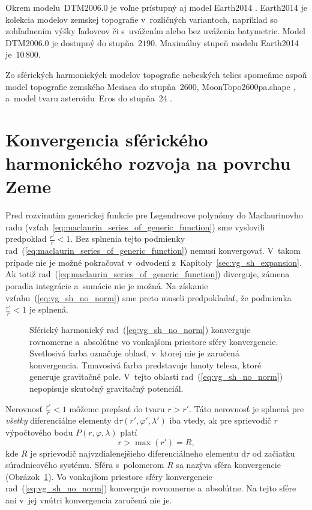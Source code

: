 \documentclass[a4paper, 12pt]{book}
\newcommand{\diff}{\mathrm d}
\begin{document}
Okrem modelu~DTM2006.0 je voľne prístupný aj model Earth2014 
\parencite{Hirt2015}.  Earth2014 je kolekcia modelov zemskej topografie 
v~rozličných variantoch, napríklad so zohľadnením výšky ľadovcov či s~uvážením 
alebo bez uváženia batymetrie.  Model DTM2006.0 je dostupný do stupňa~$2190$.  
Maximálny stupeň modelu Earth2014 je~$10\, 800$.

Zo sférických harmonických modelov topografie nebeských telies spomeňme aspoň 
model topografie zemského Mesiaca do stupňa~2600, MoonTopo2600pa.shape 
\parencite{Wieczorek2015}, a~model tvaru asteroidu~Eros do stupňa~24 
\parencite{Zuber2000}.






\section{Konvergencia sférického harmonického rozvoja na povrchu Zeme}
\label{sec:convergence_of_spherical_harmonics}

Pred rozvinutím generickej funkcie pre Legendreove polynómy do Maclaurinovho 
radu (vzťah~\ref{eq:maclaurin_series_of_generic_function}) sme vyslovili 
predpoklad $\frac{r'}{r} < 1$.  Bez splnenia tejto podmienky 
rad~(\ref{eq:maclaurin_series_of_generic_function}) nemusí konvergovať.  
V~takom prípade nie je možné pokračovať v~odvodení 
z~Kapitoly~\ref{sec:vg_sh_expansion}.  Ak totiž 
rad~(\ref{eq:maclaurin_series_of_generic_function}) diverguje, zámena poradia 
integrácie a~sumácie nie je možná.  Na získanie vzťahu~(\ref{eq:vg_sh_no_norm}) 
sme preto museli predpokladať, že podmienka $\frac{r'}{r} < 1$ je splnená.

\begin{figure}
\centering

\caption{Sférický harmonický rad~(\ref{eq:vg_sh_no_norm}) konverguje rovnomerne 
a~absolútne vo vonkajšom priestore sféry konvergencie.  Svetlosivá farba 
označuje oblasť, v~ktorej nie je zaručená konvergencia.  Tmavosivá farba 
predstavuje hmoty telesa, ktoré generuje gravitačné pole.  V~tejto oblasti 
rad~(\ref{eq:vg_sh_no_norm}) nepopisuje skutočný gravitačný potenciál.}
\label{fig:spherical_harmonics_convergence}
\end{figure}

Nerovnosť $\frac{r'}{r} < 1$ môžeme prepísať do tvaru $r > r'$.  Táto
nerovnosť je splnená pre \emph{všetky} diferenciálne elementy $\diff \tau(r',
\varphi', \lambda')$ iba vtedy, ak pre sprievodič $r$ výpočtového bodu $P(r,
\varphi, \lambda)$ platí
%
\begin{equation}
\label{eq:spherical_harmonic_convergence}
r > \max(r') = R{,}
\end{equation}
%
kde $R$ je sprievodič najvzdialenejšieho diferenciálneho elementu $\diff\tau$ 
od začiatku súradnicového systému.  Sféra s~polomerom $R$ sa nazýva sféra 
konvergencie \parencite{Hotine} 
(Obrázok~\ref{fig:spherical_harmonics_convergence}).  Vo vonkajšom priestore 
sféry konvergencie rad~(\ref{eq:vg_sh_no_norm}) konverguje rovnomerne 
a~absolútne.  Na tejto sfére ani v~jej vnútri konvergencia zaručená nie je.
\end{document}
